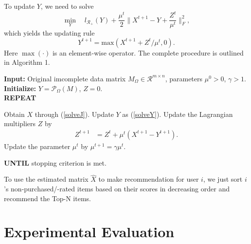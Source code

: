 \documentclass[letterpaper]{article}
\begin{document}
To update $Y$, we need to solve
\begin{equation}
\min_Y \quad l_{\mathcal{R}_+}(Y)+\frac{\mu^t}{2}\|X^{t+1}-Y+\frac{Z^t}{\mu^t}\|_F^2,
\end{equation}
which yields the updating rule
\begin{equation}
\label{solveY}
Y^{t+1}= \textrm{max}(X^{t+1}+Z^t/\mu^t,0).
\end{equation}
Here $\max(\cdot)$ is an element-wise operator. The complete procedure is outlined in Algorithm 1.
\begin{algorithm}[tb]
\small
   \caption{Solve (\ref{secondprob})}
   \label{alg:rankminimization}
  {\bfseries Input:} Original imcomplete data matrix $M_\Omega\in \mathbf{\mathcal{R}}^{m\times n}$, parameters  $\mu^0>0$, $\gamma>1$.\\
{\bfseries Initialize:} $Y=\mathcal{P}_\Omega(M)$, $Z=0$.\\
  {\bfseries REPEAT}
\begin{algorithmic}[1]
   \STATE Obtain $X$ through (\ref{solveJ}).
   \STATE Update $Y$ as (\ref{solveY}).
\STATE Update the Lagrangian multipliers $Z$ by
\begin{align*}
Z^{t+1}&=Z^{t}+\mu^t(X^{t+1}-Y^{t+1}).
\end{align*}
\STATE Update the parameter $\mu^t$ by $\mu^{t+1}=\gamma\mu^t$.
\end{algorithmic}
\textbf{ UNTIL} {stopping criterion is met.}
\end{algorithm}

To use the estimated matrix $\hat{X}$ to make recommendation for user $i$, we just sort $i$'s non-purchased/-rated items based on their scores in decreasing order and recommend the Top-N items. 

\section{Experimental Evaluation}
\end{document}
